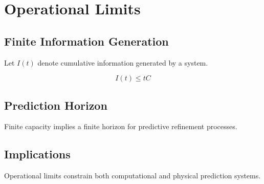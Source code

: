 \chapter{Operational Limits}

\section{Finite Information Generation}

Let \(I(t)\) denote cumulative information generated by a system.

\[
I(t) \le tC
\]

\section{Prediction Horizon}

Finite capacity implies a finite horizon for predictive refinement processes.

\section{Implications}

Operational limits constrain both computational and physical prediction systems.
